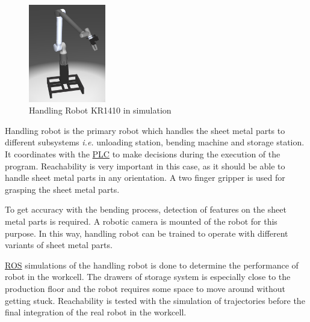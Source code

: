 \begin{figure}[h]
    \centering
    \includegraphics[width=0.3\textwidth]{figures/handling-robot-simulation.png}
    \caption{Handling Robot KR1410 in simulation}
    \label{fig:handling-robot-simulation}
\end{figure}
Handling robot is the primary robot which handles the sheet metal parts to different subsystems \textit{i.e.}
unloading station, bending machine and storage station.
It coordinates with the \hyperref[acro:PLC]{PLC} to make decisions during the execution of the program. Reachability
is very important in this case, as it should be able to handle sheet metal parts in any orientation.
A two finger gripper is used for grasping the sheet metal parts.

To get accuracy with the bending process, detection of features on the sheet metal parts is required.
A robotic camera is mounted of the robot for this purpose. In this way, handling robot can be trained 
to operate with different variants of sheet metal parts.

\hyperref[acro:ROS]{ROS} simulations of the handling robot is done to determine the performance of robot in the workcell.
The drawers of storage system is especially close
to the production floor and the robot requires some space to move around without getting stuck. 
Reachability is tested with the simulation of trajectories before the final integration of the real robot
in the workcell.